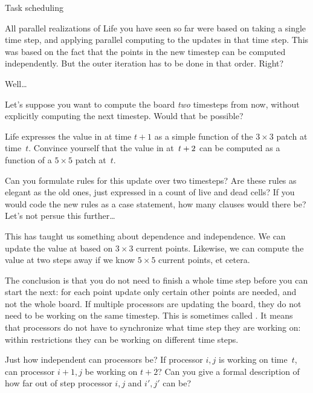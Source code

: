  {Task scheduling}
\label{sec:dag}

All parallel realizations of Life you have seen so far were based
on taking a single time step, and applying parallel computing to
the updates in that time step. This was based on the fact that
the points in the new timestep can be computed independently.
But the outer iteration has to be done in that order. Right?

Well\ldots

Let's suppose you want to compute the board \emph{two} timesteps from
now, without explicitly computing the next timestep. Would that be possible?

\begin{exercise}
  Life expresses the value in  at time $t+1$ as a simple
  function of the $3\times3$ patch  at time~$t$.
  Convince yourself that the value in  at~$t+\nobreak2$ can be
  computed as a function of a $5\times5$ patch at~$t$.

  Can you formulate rules for this update over two timesteps? Are
  these rules as elegant as the old ones, just expressed in a count of
  live and dead cells? If you would code the new rules as a case
  statement, how many clauses would there be? Let's not persue this
  further\ldots
\end{exercise}

This has taught us something about dependence and
independence. We can update
the value at  based on
$3\times3$ current points. 
Likewise, we can compute the value at  two steps away
if we know $5\times5$ current points, et cetera.

The conclusion is that you do not need to finish a whole time step before you 
can start the next: for each point update only certain other points
are needed, and not the whole board. If multiple processors are updating the board,
they do not need to be working on the same timestep.
This
is sometimes called .
It means that processors do not have to synchronize what time step they are working on:
within restrictions they can be working on different time steps.

\begin{exercise}
  Just how independent can processors be? If processor $i,j$ is
  working on time~$t$, can processor $i+1,j$ be working on $t+2$? Can
  you give a formal description of how far out of step processor $i,j$
  and $i',j'$ can be?
\end{exercise}

